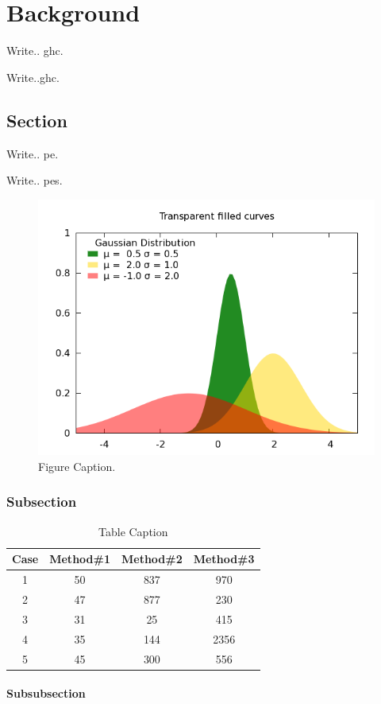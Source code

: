 

\chapter{Background}
\label{ch:background}


Write.. \gls{ghc}.

Write..\gls{ghc}.


\section{Section}

Write.. \gls{pe}.

Write.. \glspl{pe}.

\begin{figure}[hH]
 \begin{center}
 \includegraphics [width=12cm]{Figures/Background/pic.png}
 \caption{Figure Caption.}
 \label{fig:label}
\end{center}
\end{figure} 

\cite{gum, ghc-smp}

\subsection{Subsection}

\begin{table}[hH]
\begin{center}
\begin{tabular}{c c c c} %
\hline\hline %
Case & Method\#1 & Method\#2 & Method\#3 \\ [0.5ex] %
\hline %
1 & 50 & 837 & 970 \\ %
2 & 47 & 877 & 230 \\
3 & 31 & 25 & 415 \\
4 & 35 & 144 & 2356 \\
5 & 45 & 300 & 556 \\ [1ex] %
\hline %
\end{tabular}\caption{Table Caption}
\label{tab:lable}
\end{center}
\end{table}


\subsubsection{Subsubsection}